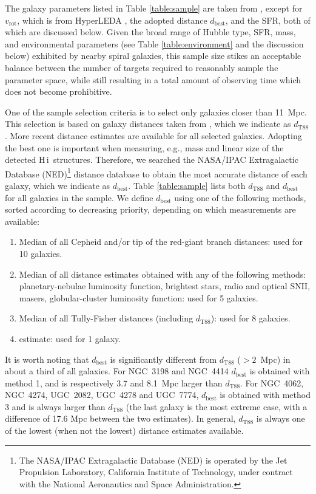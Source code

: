 \documentclass[oldversion]{aa}
\newcommand{\HI}{{\sc H\,i}}
\begin{document}
The galaxy parameters listed in Table \ref{table:sample} are taken from \citet{tully_1988}, except for $v_{\mathrm{rot}}$, which is from HyperLEDA \citep{paturel_etal_2003}, the adopted distance $d_\mathrm{best}$, and the SFR, both of which are discussed below. Given the broad range of Hubble type, SFR, mass, and environmental parameters (see Table \ref{table:environment} and the discussion below) exhibited by nearby spiral galaxies, this sample size stikes an acceptable balance between the number of targets required to reasonably sample the parameter space, while still resulting in a total amount of observing time which does not become prohibitive.

One of the sample selection criteria is to select only galaxies closer than 11~Mpc. This selection is based on galaxy distances taken from \citet{tully_1988}, which we indicate as $d_\mathrm{T88}$. More recent distance estimates are available for all selected galaxies. Adopting the best one is important when measuring, e.g., mass and linear size of the detected \HI\ structures. Therefore, we searched the NASA/IPAC Extragalactic Database (NED)\footnote{The NASA/IPAC Extragalactic Database (NED) is operated by the Jet Propulsion Laboratory, California Institute of Technology, under contract with the National Aeronautics and Space Administration.} distance database to obtain the most accurate distance of each galaxy, which we indicate as $d_\mathrm{best}$. Table \ref{table:sample} lists both $d_\mathrm{T88}$ and $d_\mathrm{best}$ for all galaxies in the sample. We define $d_\mathrm{best}$ using one of the following methods, sorted according to decreasing priority, depending on which measurements are available:
\begin{enumerate}
\item Median of all Cepheid and/or tip of the red-giant branch distances: used for 10 galaxies.
\item Median of all distance estimates obtained with any of the following methods: planetary-nebulae luminosity function, brightest stars, radio and optical SNII, masers, globular-cluster luminosity function: used for 5 galaxies.
\item Median of all Tully-Fisher distances (including $d_\mathrm{T88}$): used for 8 galaxies.
\item \citet{tully_1988} estimate: used for 1 galaxy.
\end{enumerate}

It is worth noting that $d_\mathrm{best}$ is significantly different from $d_\mathrm{T88}$ ($>2$~Mpc) in about a third of all galaxies. For NGC~3198 and NGC~4414 $d_\mathrm{best}$ is obtained with method 1, and is respectively 3.7 and 8.1~Mpc larger than $d_\mathrm{T88}$. For NGC~4062, NGC~4274, UGC~2082, UGC~4278 and UGC~7774, $d_\mathrm{best}$ is obtained with method 3 and is always larger than $d_\mathrm{T88}$ (the last galaxy is the most extreme case, with a difference of 17.6 Mpc between the two estimates). In general, $d_\mathrm{T88}$ is always one of the lowest (when not the lowest) distance estimates available.
\end{document}
